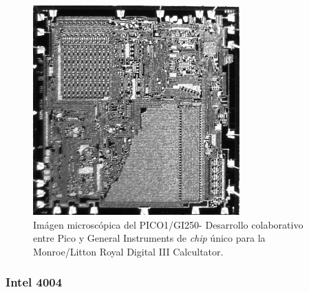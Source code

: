 \begin{figure}
  \centering
  \includegraphics[scale=0.5]{./figures/C02-pico1_gi250}
  \captionsetup{justification=centering}
  \caption{Imágen microscópica del PICO1/GI250- Desarrollo colaborativo entre Pico y General Instruments de \emph{chip} único para la Monroe/Litton Royal Digital III Calcultator.}
  \label{fig:C02-pico1_gi250}
\end{figure}

\subsubsection{Intel 4004}

